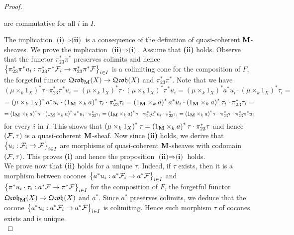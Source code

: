\begin{proof}
\begin{enumerate}[label= \textbf{(\roman*)}, leftmargin=3.0em]
\begin{center}
\end{center}
are commutative for all $i$ in $I$.
\end{enumerate}
The implication $\textbf{(i)}\Rightarrow \textbf{(ii)}$ is a consequence of the definition of quasi-coherent $\mathbf{M}$-sheaves. We prove the implication $\textbf{(ii)}\Rightarrow \textbf{(i)}$. Assume that \textbf{(ii)} holds. Observe that the functor $\pi_{23}^*\pi^*$ preserves colimits and hence $\big\{\pi_{23}^*\pi^*u_i:\pi^*_{23}\pi^*{\mathcal F}_i\rightarrow \pi_{23}^*\pi^*{\mathcal F} \big\}_{i\in I}$ is a colimiting cone for the composition of $F$, the forgetful functor $\mathfrak{Qcoh}_{\mathbf{M}}(X)\rightarrow \mathfrak{Qcoh}(X)$ and $\pi_{23}^*\pi^*$. Note that we have
$$\left(\mu \times_k 1_X\right)^*\tau \cdot \pi^*_{23}\pi^*u_i = \left(\mu \times_k 1_X\right)^*\tau \cdot \left(\mu\times_k 1_X\right)^*\pi^*u_i = \left(\mu \times_k 1_X\right)^*a^*u_i \cdot \left(\mu \times_k 1_X\right)^*\tau_i =$$
$$=\left(\mu \times_k 1_X\right)^*a^*u_i \cdot \left(1_{\mathbf{M}}\times_k a\right)^*\tau_i \cdot \pi_{23}^*\tau_i = \left(1_{\mathbf{M}} \times_k a \right)^*a^*u_i \cdot \left(1_{\mathbf{M}}\times_k a\right)^*\tau_i \cdot \pi_{23}^*\tau_i =$$
$$= \left(1_{\mathbf{M}}\times_k a\right)^*\tau\cdot  \left(1_{\mathbf{M}}\times_k a\right)^*\pi^*u_i\cdot \pi^*_{23}\tau_i = \left(1_{\mathbf{M}}\times_k a\right)^*\tau \cdot  \pi_{23}^*a^*u_i \cdot \pi^*_{23}\tau_i = \left(1_{\mathbf{M}}\times_k a\right)^*\tau \cdot  \pi_{23}^*\tau \cdot \pi^*_{23}\pi^*u_i$$
for every $i$ in $I$. This shows that $\left(\mu \times_k 1_X\right)^*\tau =  \left(1_{\mathbf{M}}\times_k a\right)^*\tau \cdot  \pi_{23}^*\tau$ and hence $({\mathcal F},\tau)$ is a quasi-coherent $\mathbf{M}$-sheaf. Now since \textbf{(ii)} holds, we derive that $\big\{u_i:{\mathcal F}_i\rightarrow {\mathcal F}\big\}_{i\in I}$ are morphisms of quasi-coherent $\mathbf{M}$-sheaves with codomain $({\mathcal F},\tau)$. This proves \textbf{(i)} and hence the proposition $\textbf{(ii)}\Rightarrow \textbf{(i)}$ holds.\\
We prove now that \textbf{(ii)} holds for a unique $\tau$. Indeed, if $\tau$ exists, then it is a morphism between cocones $\big\{a^*u_i:a^*{\mathcal F}_i\rightarrow a^*{\mathcal F}\big\}_{i\in I}$ and $\big\{\pi^*u_i\cdot \tau_i:a^*{\mathcal F}\rightarrow \pi^*{\mathcal F}\big\}_{i\in I}$ for the composition of $F$, the forgetful functor $\mathfrak{Qcoh}_{\mathbf{M}}(X)\rightarrow \mathfrak{Qcoh}(X)$ and $a^*$. Since $a^*$ preserves colimits, we deduce that the cocone $\big\{a^*u_i:a^*{\mathcal F}_i\rightarrow a^*{\mathcal F}\big\}_{i\in I}$ is colimiting. Hence such morphism $\tau$ of cocones exists and is unique.\\

\end{proof}
